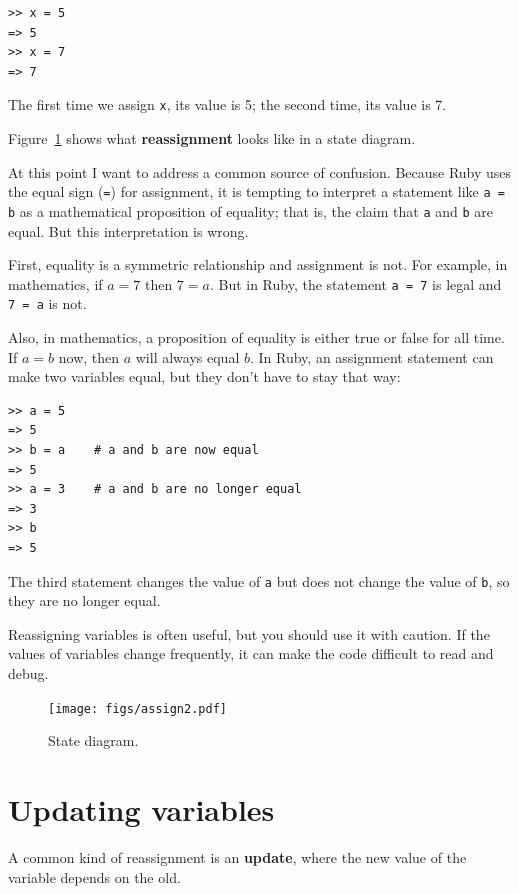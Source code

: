 \documentclass[10pt]{book}
\begin{document}
\begin{verbatim}
>> x = 5
=> 5
>> x = 7
=> 7
\end{verbatim}
%
The first time we assign 
{\tt x}, its value is 5; the second time, its
value is 7.

Figure~\ref{fig.assign2} shows what {\bf reassignment} looks
like in a state diagram.

At this point I want to address a common source of
confusion.
Because Ruby uses the equal sign ({\tt =}) for assignment, it is
tempting to interpret a statement like {\tt a = b} as a
mathematical
proposition of equality; that is, the claim that {\tt a} and
{\tt b} are equal.  But this interpretation is wrong.

First, equality is a symmetric relationship and assignment is not.  For
example, in mathematics, if $a=7$ then $7=a$.  But in Ruby, the
statement {\tt a = 7} is legal and {\tt 7 = a} is not.

Also, in mathematics, a proposition of equality is either true or
false for all time.  If $a=b$ now, then $a$ will always equal $b$.
In Ruby, an assignment statement can make two variables equal, but
they don't have to stay that way:

\begin{verbatim}
>> a = 5
=> 5
>> b = a    # a and b are now equal
=> 5
>> a = 3    # a and b are no longer equal
=> 3
>> b
=> 5
\end{verbatim}
%
The third statement changes the value of {\tt a} but does not change the
value of {\tt b}, so they are no longer equal. 

Reassigning variables is often useful, but you should use it
with caution.  If the values of variables change frequently, it can
make the code difficult to read and debug.

\begin{figure}
\centerline
{\texttt{[image: figs/assign2.pdf]}}
\caption{State diagram.}
\label{fig.assign2}
\end{figure}



\section{Updating variables}
\label{update}


A common kind of reassignment is an {\bf update},
where the new value of the variable depends on the old.
\end{document}
